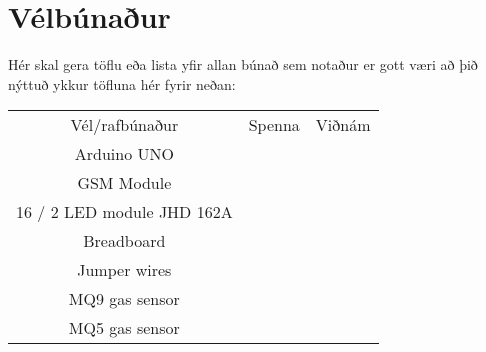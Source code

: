 \section{Vélbúnaður}
Hér skal gera töflu eða lista yfir allan búnað sem notaður er gott væri að þið nýttuð ykkur töfluna hér fyrir neðan:

\begin{center}
\begin{tabular}{ |c|c|c| } 
 \hline
 Vél/rafbúnaður &Spenna &Viðnám\\ 
 Arduino UNO & &\\ 
 GSM Module & & \\ 
 16 / 2 LED module JHD 162A & & \\
 Breadboard & & \\
 Jumper wires & & \\
 MQ9 gas sensor & & \\
 MQ5 gas sensor & & \\ 
 \hline
\end{tabular}
\end{center}